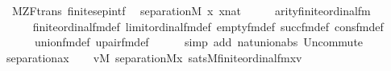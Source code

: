 \begin{isabellebody}
%
\isadelimproof
\isanewline
%
\endisadelimproof
\isanewline
\isanewline
\isanewline
{}\isamarkupfalse%
\ {\isacharparenleft}{\kern0pt}\ M{\isacharunderscore}{\kern0pt}ZF{\isacharunderscore}{\kern0pt}trans{\isacharparenright}{\kern0pt}\ finite{\isacharunderscore}{\kern0pt}sep{\isacharunderscore}{\kern0pt}intf{\isacharcolon}{\kern0pt}\isanewline
\ \ {\isachardoublequoteopen}separation{\isacharparenleft}{\kern0pt}{\isacharhash}{\kern0pt}{\isacharhash}{\kern0pt}M{\isacharcomma}{\kern0pt}\ {\isasymlambda}x{\isachardot}{\kern0pt}\ x{\isasymin}nat{\isacharparenright}{\kern0pt}{\isachardoublequoteclose}\isanewline
%
\isadelimproof
%
\endisadelimproof
%
\isatagproof
{}\isamarkupfalse%
\ {\isacharminus}{\kern0pt}\isanewline
\ \ \isamarkupfalse%
\ {\isachardoublequoteopen}arity{\isacharparenleft}{\kern0pt}finite{\isacharunderscore}{\kern0pt}ordinal{\isacharunderscore}{\kern0pt}fm{\isacharparenleft}{\kern0pt}{}{\isacharparenright}{\kern0pt}{\isacharparenright}{\kern0pt}\ {\isacharequal}{\kern0pt}\ {}\ {\isachardoublequoteclose}\isanewline
\ \ \ \ \isamarkupfalse%
\ finite{\isacharunderscore}{\kern0pt}ordinal{\isacharunderscore}{\kern0pt}fm{\isacharunderscore}{\kern0pt}def\ limit{\isacharunderscore}{\kern0pt}ordinal{\isacharunderscore}{\kern0pt}fm{\isacharunderscore}{\kern0pt}def\ empty{\isacharunderscore}{\kern0pt}fm{\isacharunderscore}{\kern0pt}def\ succ{\isacharunderscore}{\kern0pt}fm{\isacharunderscore}{\kern0pt}def\ cons{\isacharunderscore}{\kern0pt}fm{\isacharunderscore}{\kern0pt}def\isanewline
\ \ \ \ \ \ union{\isacharunderscore}{\kern0pt}fm{\isacharunderscore}{\kern0pt}def\ upair{\isacharunderscore}{\kern0pt}fm{\isacharunderscore}{\kern0pt}def\isanewline
\ \ \ \ \isamarkupfalse%
\ {\isacharparenleft}{\kern0pt}simp\ add{\isacharcolon}{\kern0pt}\ nat{\isacharunderscore}{\kern0pt}union{\isacharunderscore}{\kern0pt}abs{}\ Un{\isacharunderscore}{\kern0pt}commute{\isacharparenright}{\kern0pt}\isanewline
\ \ \isamarkupfalse%
\ separation{\isacharunderscore}{\kern0pt}ax\isanewline
\ \ \isamarkupfalse%
\ {\isachardoublequoteopen}{\isacharparenleft}{\kern0pt}{\isasymforall}v{\isasymin}M{\isachardot}{\kern0pt}\ separation{\isacharparenleft}{\kern0pt}{\isacharhash}{\kern0pt}{\isacharhash}{\kern0pt}M{\isacharcomma}{\kern0pt}{\isasymlambda}x{\isachardot}{\kern0pt}\ sats{\isacharparenleft}{\kern0pt}M{\isacharcomma}{\kern0pt}finite{\isacharunderscore}{\kern0pt}ordinal{\isacharunderscore}{\kern0pt}fm{\isacharparenleft}{\kern0pt}{}{\isacharparenright}{\kern0pt}{\isacharcomma}{\kern0pt}{\isacharbrackleft}{\kern0pt}x{\isacharcomma}{\kern0pt}v{\isacharbrackright}{\kern0pt}{\isacharparenright}{\kern0pt}{\isacharparenright}{\kern0pt}{\isacharparenright}{\kern0pt}{\isachardoublequoteclose}\isanewline

\end{isabellebody}
